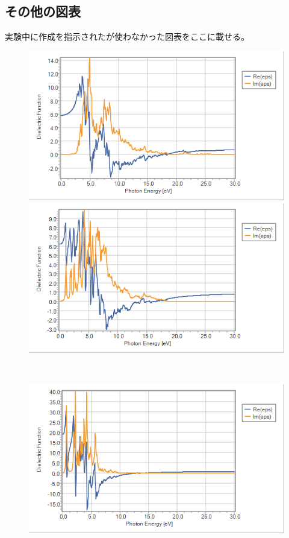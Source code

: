 \documentclass[11pt,dvipdfmx,a4paper]{jsarticle}
\begin{document}
\subsection*{その他の図表}
実験中に作成を指示されたが使わなかった図表をここに載せる。

\begin{figure}[H]
    \centering
    \begin{minipage}[t]{0.48\columnwidth}
        \centering
        \includegraphics[width = \columnwidth]{graph/graph7.png}
    \end{minipage}
    \hfil
    \begin{minipage}[t]{0.48\columnwidth}
        \centering
        \includegraphics[width = \columnwidth]{graph/graph8.png}
    \end{minipage}\\
    \begin{minipage}[t]{0.48\columnwidth}
        \centering
        \includegraphics[width = \columnwidth]{graph/graph9.png}

\end{minipage}
\end{figure}
\end{document}
